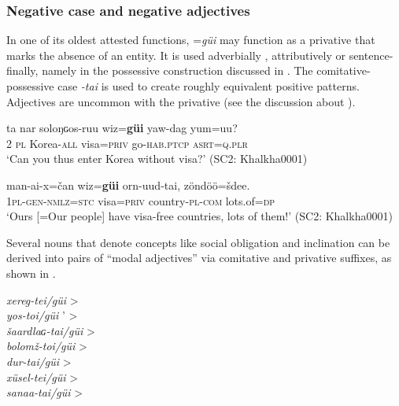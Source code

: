 \documentclass[output=paper,colorlinks,citecolor=brown,chinesefont]{langscibook}
\begin{document}
\subsubsection{Negative case and negative adjectives}\label{sec:kha:3.3.2}

In one of its oldest attested functions, =\textit{güi} may function as a privative that marks the absence of an entity. It is used adverbially , attributively  or sentence-finally, namely in the possessive construction discussed in . The comitative-possessive case \textit{-tai} is used to create roughly equivalent positive patterns. Adjectives are uncommon with the privative (see the discussion about ).

\ea\label{ex:kha:65}
    \gll ta nar soloŋɢos-ruu wiz=\textbf{güi} yaw-dag yum=uu? \\ 
         \textsc{2} \textsc{pl} Korea-\textsc{all} visa=\textsc{priv} go-\textsc{hab.ptcp} \textsc{asrt=q.plr} \\
    \glt ‘Can you thus enter Korea without visa?’ (SC2: Khalkha0001)
\z 

\ea\label{ex:kha:66}
    \gll man-ai-x=čan wiz=\textbf{güi} orn-uud-tai, zöndöö=šdee. \\ 
         \textsc{1pl-gen-nmlz=stc} visa=\textsc{priv} country-\textsc{pl-com}   lots.of=\textsc{dp} \\  
    \glt ‘Ours [=Our people] have visa-free countries, lots of them!’ (SC2: Khalkha0001)
\z 

Several nouns that denote concepts like social obligation and inclination can be derived into pairs of “modal adjectives” via comitative and privative suffixes, as shown in .


\ea\label{ex:kha:67}
    \textit{xereg-tei/güi}             \tab  >   \\
    \textit{yos-toi/güi}         ’        \tab  >   \\
    \textit{šaardlaɢ{}-tai/güi}      \tab  >   \\
    \textit{bolomž-toi/güi}        \tab  >   \\
    \textit{dur-tai/güi}                  \tab  >   \\
    \textit{xüsel-tei/güi}                  \tab  >   \\
    \textit{sanaa-tai/güi}             \tab  >   \\
\z 
\end{document}

